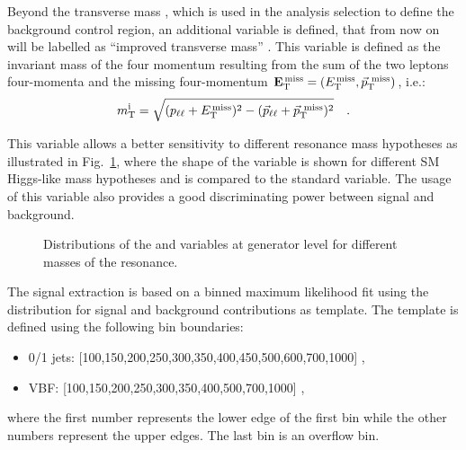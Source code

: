 Beyond the transverse mass \mt, which is used in the analysis selection to define the \dytt background control region, an additional variable is defined, that from now on will be labelled as ``improved transverse mass'' \mti. This variable is defined as the invariant mass of the four momentum resulting from the sum of the two leptons four-momenta and the missing four-momentum $\mathbf{E_\mathrm{T}^\mathrm{\,miss}} = (E_\mathrm{T}^\mathrm{\,miss}, \vec{p}_\mathrm{T}^\mathrm{~miss})$, i.e.:
\begin{equation} 
m_\mathrm{T}^\mathrm{i} = \sqrt{(p_{\ell\ell}+E_\mathrm{T}^\mathrm{\,miss})^2-(\vec{p}_{\ell\ell}+\vec{p}_\mathrm{T}^\mathrm{~miss})^2} \quad .
\end{equation}

This variable allows a better sensitivity to different resonance mass hypotheses as illustrated in Fig.~\ref{fig:mti}, where the shape of the \mti variable is shown for different SM Higgs-like mass hypotheses and is compared to the standard \mt variable. The usage of this variable also provides a good discriminating power between signal and background.

\begin{figure}[htb]
\centering
{}
\caption{
    Distributions of the \mt and \mti variables at generator level for different masses of the resonance.}
    \label{fig:mti}
\end{figure}

The signal extraction is based on a binned maximum likelihood fit using the \mti distribution for signal and background contributions as template. The \mti template is defined using the following bin boundaries:
\begin{itemize}
\item {0/1 jets: } [100,150,200,250,300,350,400,450,500,600,700,1000] ,
\item {VBF: } [100,150,200,250,300,350,400,500,700,1000] ,
\end{itemize}
where the first number represents the lower edge of the first bin while the other numbers represent the upper edges. The last bin is an overflow bin.


